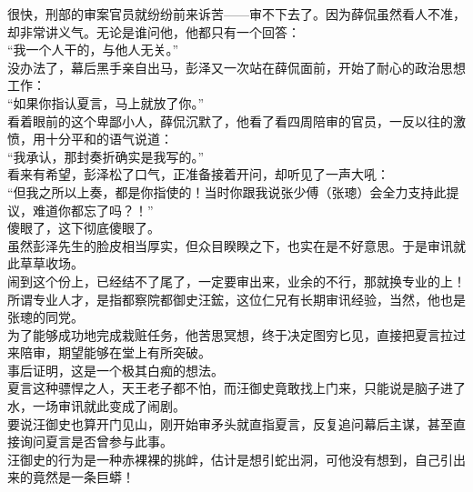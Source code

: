 \begin{multicols}{\theparacolNo}
很快，刑部的审案官员就纷纷前来诉苦——审不下去了。因为薛侃虽然看人不准，却非常讲义气。无论是谁问他，他都只有一个回答：\\

“我一个人干的，与他人无关。”\\

没办法了，幕后黑手亲自出马，彭泽又一次站在薛侃面前，开始了耐心的政治思想工作：\\

“如果你指认夏言，马上就放了你。”\\

看着眼前的这个卑鄙小人，薛侃沉默了，他看了看四周陪审的官员，一反以往的激愤，用十分平和的语气说道：\\

“我承认，那封奏折确实是我写的。”\\

看来有希望，彭泽松了口气，正准备接着开问，却听见了一声大吼：\\

“但我之所以上奏，都是你指使的！当时你跟我说张少傅（张璁）会全力支持此提议，难道你都忘了吗？！”\\

傻眼了，这下彻底傻眼了。\\

虽然彭泽先生的脸皮相当厚实，但众目睽睽之下，也实在是不好意思。于是审讯就此草草收场。\\

闹到这个份上，已经结不了尾了，一定要审出来，业余的不行，那就换专业的上！\\

所谓专业人才，是指都察院都御史汪鋐，这位仁兄有长期审讯经验，当然，他也是张璁的同党。\\

为了能够成功地完成栽赃任务，他苦思冥想，终于决定图穷匕见，直接把夏言拉过来陪审，期望能够在堂上有所突破。\\

事后证明，这是一个极其白痴的想法。\\

夏言这种骠悍之人，天王老子都不怕，而汪御史竟敢找上门来，只能说是脑子进了水，一场审讯就此变成了闹剧。\\

要说汪御史也算开门见山，刚开始审矛头就直指夏言，反复追问幕后主谋，甚至直接询问夏言是否曾参与此事。\\

汪御史的行为是一种赤裸裸的挑衅，估计是想引蛇出洞，可他没有想到，自己引出来的竟然是一条巨蟒！\\


\end{multicols}
